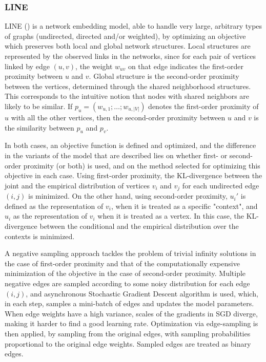 \subsubsection{LINE}

LINE (\cite{DBLP:journals/corr/TangQWZYM15}) is a network embedding model, able to handle very large, arbitrary types of graphs (undirected, directed and/or weighted), by optimizing an objective which preserves both local and global network structures. Local structures are represented by the observed links in the networks, since for each pair of vertices linked by edge $(u, v)$, the weight $w_{uv}$ on that edge indicates the first-order proximity between $u$ and $v$. Global structure is the second-order proximity between the vertices, determined through the shared neighborhood structures. This corresponds to the intuitive notion that nodes with shared neighbors are likely to be similar. If $p_u = (w_{u,1}; \dots ;w_{u,|V|})$ denotes the first-order proximity of $u$ with all the other vertices, then the second-order proximity between $u$ and $v$ is the similarity between $p_u$ and $p_v$.

In both cases, an objective function is defined and optimized, and the difference in the variants of the model that are described lies on whether first- or second-order proximity (or both) is used, and on the method selected for optimizing this objective in each case. Using first-order proximity, the KL-divergence between the joint and the empirical distribution of vertices $v_i$ and $v_j$ for each undirected edge $(i,j)$ is minimized. On the other hand, using second-order proximity, $u_i'$ is defined as the representation of $v_i$, when it is treated as a specific "context", and $u_i$ as the representation of $v_i$ when it is treated as a vertex. In this case, the KL-divergence between the conditional and the empirical distribution over the contexts is minimized.

A negative sampling approach tackles the problem of trivial infinity solutions in the case of first-order proximity and that of the computationally expensive minimization of the objective in the case of second-order proximity. Multiple negative edges are sampled according to some noisy distribution for each edge $(i,j)$, and asynchronous Stochastic Gradient Descent algorithm is used, which, in each step, samples a mini-batch of edges and updates the model parameters.
When edge weights have a high variance, scales of the gradients in SGD diverge, making it harder to find a good learning rate. Optimization via edge-sampling is then applied, by sampling from the original edges, with sampling probabilities proportional to the original edge weights. Sampled edges are treated as binary edges.

